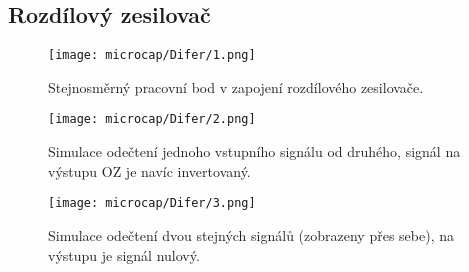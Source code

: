\clearpage
\subsection{Rozdílový zesilovač}
    \begin{figure}[h!]
        \centering
        \texttt{[image: microcap/Difer/1.png]}
        \centering
        \caption{Stejnosměrný pracovní bod v zapojení rozdílového zesilovače.}
        \label{fig:}
    \end{figure}

    \begin{figure}[h!]
        \centering
        \texttt{[image: microcap/Difer/2.png]}
        \centering
        \caption{Simulace odečtení jednoho vstupního signálu od druhého, signál na výstupu OZ je navíc invertovaný.}
        \label{fig:}
    \end{figure}

    \begin{figure}[h!]
        \centering
        \texttt{[image: microcap/Difer/3.png]}
        \centering
        \caption{Simulace odečtení dvou stejných signálů (zobrazeny přes sebe), na výstupu je signál nulový.}
        \label{fig:}
    \end{figure}
